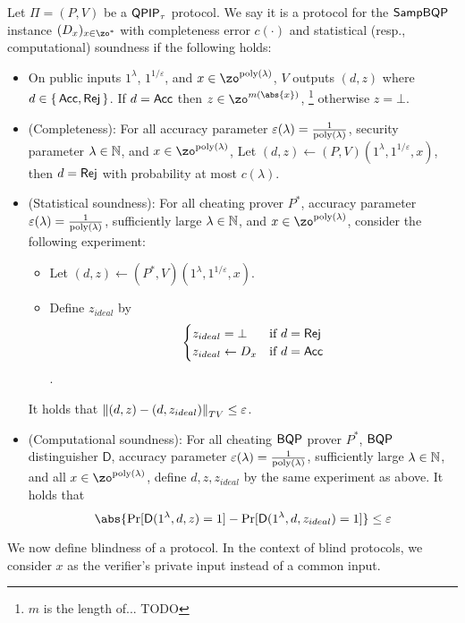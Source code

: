 \begin{definition}
	\label{dfn:stats-secure-proto-sampbqp}
	Let $\Pi=(P, V)$ be a $\operatorname{\mathsf{QPIP}}_\tau$ protocol.
	We say it is a protocol for the $\operatorname{\mathsf{SampBQP}}$ instance $(D_x)_{x\in\zo^*}$ with completeness error $c(\cdot)$ and statistical (resp., computational) soundness if the following holds:
	\begin{itemize}
		\item On public inputs $1^\lambda$, $1^{1/\varepsilon}$, and $x\in\zo^{\poly(\lambda)}$, $V$ outputs $(d, z)$ where $d\in\set{\mathsf{Acc}, \mathsf{Rej}}$. If $d=\mathsf{Acc}$ then $z\in\zo^{m(\abs{x})}$, \footnote{$m$ is the length of... TODO} otherwise $z=\bot$.
		\item (Completeness):
			For all accuracy parameter $\varepsilon(\lambda)=\frac{1}{\operatorname*{\operatorname{poly}}(\lambda)}$,
			security parameter $\lambda\in\mathbb{N}$,
			and $x\in\zo^{\poly(\lambda)}$, 
			Let $(d, z)\leftarrow(P, V)(1^\lambda, 1^{1/\varepsilon}, x)$, then $d=\mathsf{Rej}$ with probability at most $c(\lambda)$.
		\item (Statistical soundness): For all cheating prover $P^*$,
		    accuracy parameter $\varepsilon(\lambda)=\frac{1}{\operatorname*{\operatorname{poly}}(\lambda)}$,
			sufficiently large $\lambda\in\mathbb{N}$, and $x\in\zo^{\poly(\lambda)}$, 
			consider the following experiment:
			\begin{itemize}
				\item Let $(d, z)\leftarrow(P^*, V)(1^\lambda, 1^{1/\varepsilon}, x)$.
				\item Define $z_{ideal}$ by
				$$\begin{cases}
					z_{ideal}=\bot & \text{if } d=\mathsf{Rej}\\
					z_{ideal}\leftarrow D_x & \text{if } d=\mathsf{Acc}
				\end{cases}$$.
			\end{itemize}
			It holds that $\left\lVert(d,z)-(d,z_{ideal})\right\rVert_{TV}\leq\varepsilon$. 
		\item (Computational soundness):
		For all cheating $\operatorname{\mathsf{BQP}}$ prover $P^*$, $\operatorname{\mathsf{BQP}}$ distinguisher $\mathsf{D}$, accuracy parameter $\varepsilon(\lambda)=\frac{1}{\operatorname*{\operatorname{poly}}(\lambda)}$,
			sufficiently large $\lambda\in\mathbb{N}$, and all $x\in\zo^{\poly(\lambda)}$, 
			define $d, z, z_{ideal}$ by the same experiment as above.
			It holds that
			$$\abs{\Pr[\mathsf{D}(1^{\lambda}, d,z) = 1] - \Pr[\mathsf{D}(1^{\lambda}, d,z_{ideal}) = 1]} \leq \varepsilon $$
	\end{itemize}
\end{definition}

We now define blindness of a protocol.
In the context of blind protocols, we consider $x$ as the verifier's private input instead of a common input.  

